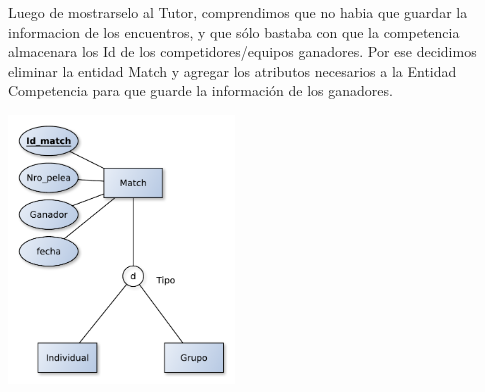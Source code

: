 Luego de mostrarselo al Tutor, comprendimos que no habia que guardar la informacion de los encuentros, y que s\'olo
bastaba con que la competencia almacenara los Id de los competidores/equipos ganadores. Por ese decidimos eliminar la entidad Match y agregar los atributos necesarios a la Entidad Competencia para que guarde la informaci\'on de los ganadores.
\begin{center}
\includegraphics[width=6cm,keepaspectratio]{./imagenes/des2.pdf}\newline
\end{center}




